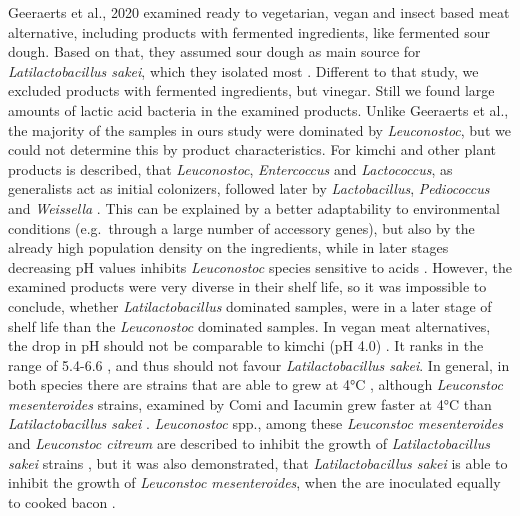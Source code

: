 \documentclass[preprint, 3p,
authoryear]{elsarticle} %
\begin{document}
Geeraerts et al., 2020 examined ready to vegetarian, vegan and insect
based meat alternative, including products with fermented ingredients,
like fermented sour dough. Based on that, they assumed sour dough as
main source for \emph{Latilactobacillus sakei}, which they isolated most
\citep{Geeraerts.2020}. Different to that study, we excluded products
with fermented ingredients, but vinegar. Still we found large amounts of
lactic acid bacteria in the examined products. Unlike Geeraerts et al.,
the majority of the samples in ours study were dominated by
\emph{Leuconostoc}, but we could not determine this by product
characteristics. For kimchi and other plant products is described, that
\emph{Leuconostoc}, \emph{Entercoccus} and \emph{Lactococcus}, as
generalists act as initial colonizers, followed later by
\emph{Lactobacillus}, \emph{Pediococcus} and \emph{Weissella}
\citep{Yu.2020}. This can be explained by a better adaptability to
environmental conditions (e.g.~through a large number of accessory
genes), but also by the already high population density on the
ingredients, while in later stages decreasing pH values inhibits
\emph{Leuconostoc} species sensitive to acids \citep{Yu.2020}. However,
the examined products were very diverse in their shelf life, so it was
impossible to conclude, whether \emph{Latilactobacillus} dominated
samples, were in a later stage of shelf life than the \emph{Leuconostoc}
dominated samples. In vegan meat alternatives, the drop in pH should not
be comparable to kimchi (pH 4.0) \citep{You.2017}. It ranks in the range
of 5.4-6.6 \citep{Geeraerts.2020, Toth.2021}, and thus should not favour
\emph{Latilactobacillus sakei}. In general, in both species there are
strains that are able to grew at 4°C
\citep{Hamasaki.2003, Jung.2014, Zagorec.2017}, although
\emph{Leuconstoc mesenteroides} strains, examined by Comi and Iacumin
grew faster at 4°C than \emph{Latilactobacillus sakei}
\citep{Comi.2012}. \emph{Leuconostoc} spp., among these \emph{Leuconstoc
mesenteroides} and \emph{Leuconstoc citreum} are described to inhibit
the growth of \emph{Latilactobacillus sakei} strains
\citep{Kim.2013, Lee.2015}, but it was also demonstrated, that
\emph{Latilactobacillus sakei} is able to inhibit the growth of
\emph{Leuconstoc mesenteroides}, when the are inoculated equally to
cooked bacon \citep{Comi.2016}.
\end{document}
